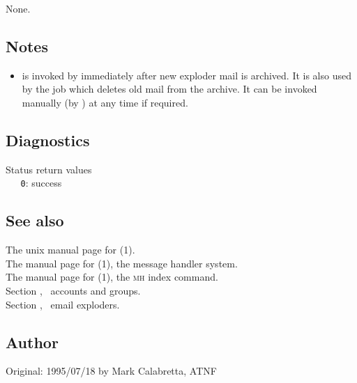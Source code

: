 None.

\subsection*{Notes}

\begin{itemize}
\item
    is invoked by  immediately after new
   exploder mail is archived.  It is also used by the 
    job which deletes old mail from the
   \mbox{} archive.  It can be invoked manually (by
   ) at any time if required.
\end{itemize}

\subsection*{Diagnostics}

Status return values
\\ \verb+   0+: success

\subsection*{See also}

The unix manual page for (1).\\
The manual page for (1), the message handler system.\\
The manual page for (1), the \textsc{mh} index command.\\
Section , \aipspp\ accounts and groups.\\
Section , \aipspp\ email exploders.

\subsection*{Author}

Original: 1995/07/18 by Mark Calabretta, ATNF


\newpage
\section{}
\label{scanpick}

